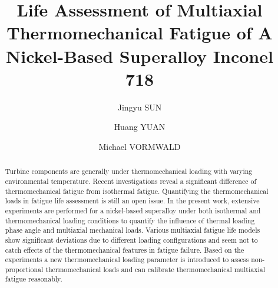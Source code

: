 \documentclass[preprint,5p,twocolumn,11pt,sort&compress]{elsarticle}
\begin{document}



\begin{frontmatter}



\title{Life Assessment of Multiaxial Thermomechanical Fatigue of A Nickel-Based Superalloy Inconel 718}


\author{Jingyu SUN}
\author{Huang YUAN}
\author{Michael VORMWALD}

\address[label1]{School of Aerospace Engineering, Tsinghua University, Beijing, China}
\address[label2]{Department of Civil Engineering, Technical University of Darmstadt, Germany}

\begin{abstract}

Turbine components are generally under thermomechanical loading with varying environmental temperature. Recent investigations reveal a significant difference of thermomechanical fatigue from isothermal fatigue. Quantifying the thermomechanical loads in fatigue life assessment is still an open issue. In the present work, extensive experiments are performed for a nickel-based superalloy under both isothermal and thermomechanical loading conditions to quantify the influence of thermal loading phase angle and multiaxial mechanical loads. Various multiaxial fatigue life models show significant deviations due to different loading configurations and seem not to catch effects of the thermomechanical features in fatigue failure. Based on the experiments a new thermomechanical loading parameter is introduced to assess non-proportional thermomechanical loads and can calibrate thermomechanical multiaxial fatigue reasonably.


\end{abstract}
\end{frontmatter}
\end{document}
